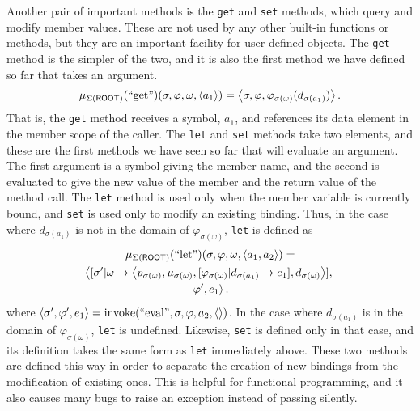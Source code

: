 \documentclass[twocolumn]{article}
\begin{document}
Another pair of important methods is the \texttt{get} and \texttt{set}
methods, which query and modify member values. These are not used by
any other built-in functions or methods, but they are an important
facility for user-defined objects. The \texttt{get} method is the
simpler of the two, and it is also the first method we have defined so
far that takes an argument.
\[ \mu_{\Sigma(\mathsf{ROOT})}(\text{``get''})(\sigma,\varphi,\omega,
\left< a_1\right>) = \left< \sigma, \varphi,
\varphi_{\sigma(\omega)}(d_{\sigma(a_1)})\right>.\] That is, the
\texttt{get} method receives a symbol, $a_1$, and references its data
element in the member scope of the caller. The \texttt{let} and
\texttt{set} methods take two elements, and these are the first
methods we have seen so far that will evaluate an argument. The first
argument is a symbol giving the member name, and the second is
evaluated to give the new value of the member and the return value of
the method call. The \texttt{let} method is used only when the member
variable is currently bound, and \texttt{set} is used only to modify
an existing binding. Thus, in the case where $d_{\sigma(a_1)}$ is not
in the domain of $\varphi_{\sigma(\omega)}$, \texttt{let} is defined
as
\begin{multline*}
  \mu_{\Sigma(\mathsf{ROOT})}(\text{``let''})(\sigma,\varphi,\omega,
  \left< a_1,a_2\right>) =\\ \left< [\sigma'|\omega\rightarrow \left< p_{\sigma(\omega)},
  \mu_{\sigma(\omega)},[\varphi_{\sigma(\omega)}|d_{\sigma(a_1)}\rightarrow e_1],
  d_{\sigma(\omega)}\right>],\right.\\\left.\varphi', e_1\right>.
\end{multline*}
where $\left< \sigma',\varphi',e_1 \right> = \operatorname{invoke}(\text{``eval''},\sigma,
\varphi, a_2, \left<\right>)$. In the case where $d_{\sigma(a_1)}$ is in the
domain of $\varphi_{\sigma(\omega)}$, \texttt{let} is
undefined. Likewise, \texttt{set} is defined only in that case, and
its definition takes the same form as \texttt{let} immediately
above. These two methods are defined this way in order to separate the
creation of new bindings from the modification of existing ones. This
is helpful for functional programming, and it also causes many bugs to
raise an exception instead of passing silently.
\end{document}
